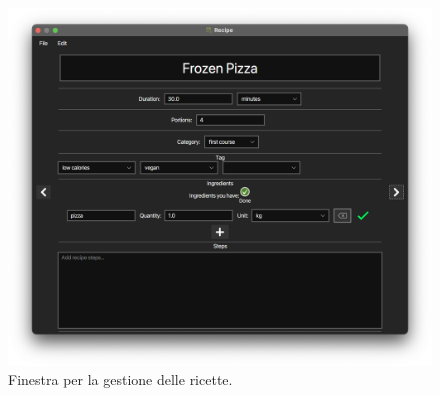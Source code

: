 \begin{figure}[H]
    \includegraphics[width=\linewidth]{images/recipe-view.png}
    \caption{Finestra per la gestione delle ricette.}
    \label{fig:recipeview}
\end{figure}
